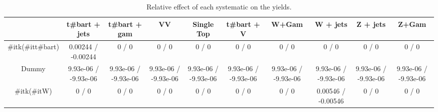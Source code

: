 \begin{table}[htbp]
\begin{center}
\footnotesize
\begin{tabular}{|c|c|c|c|c|c|c|c|c|c|}
\hline 
      & t#bar{t} + jets      & t#bar{t} +  gam      & VV      & Single Top      & t#bar{t} + V      & W+Gam      & W + jets      & Z + jets      & Z+Gam \\ 
\hline 
  #it{k}(#it{t#bar{t}}) & 0.00244 / -0.00244 & 0 / 0 & 0 / 0 & 0 / 0 & 0 / 0 & 0 / 0 & 0 / 0 & 0 / 0 & 0 / 0 \\ 
  Dummy & 9.93e-06 / -9.93e-06 & 9.93e-06 / -9.93e-06 & 9.93e-06 / -9.93e-06 & 9.93e-06 / -9.93e-06 & 9.93e-06 / -9.93e-06 & 9.93e-06 / -9.93e-06 & 9.93e-06 / -9.93e-06 & 9.93e-06 / -9.93e-06 & 9.93e-06 / -9.93e-06 \\ 
  #it{k}(#it{W}) & 0 / 0 & 0 / 0 & 0 / 0 & 0 / 0 & 0 / 0 & 0 / 0 & 0.00546 / -0.00546 & 0 / 0 & 0 / 0 \\ 
\hline 
\end{tabular} 
\caption{Relative effect of each systematic on the yields.} 
\end{center} 
\end{table} 
